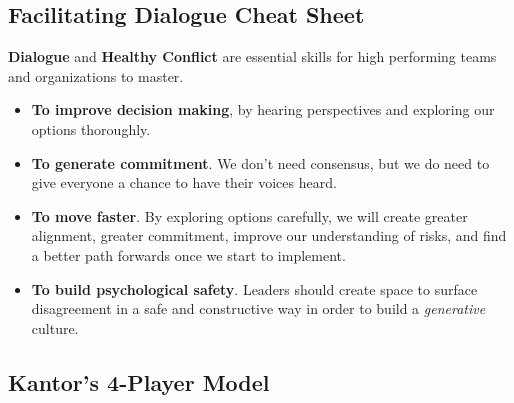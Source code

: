 \documentclass{article}
\newenvironment{nosepitemize}
{ \begin{itemize}
    \setlength{\itemsep}{0pt}
    \setlength{\parskip}{0pt}
    \setlength{\parsep}{0pt}     }
{ \end{itemize}                  }
\begin{document}
\begin{center}
     \section{Facilitating Dialogue Cheat Sheet}
\end{center}

\begin{multicols}{2}

\noindent
\textbf{Dialogue} and \textbf{Healthy Conflict} are essential skills for high performing teams and organizations to master.

\begin{nosepitemize}
    \item \textbf{To improve decision making}, by hearing perspectives and exploring our options thoroughly.
    \item \textbf{To generate commitment}. We don't need consensus, but we do need to give everyone a chance to have their voices heard.
    \item \textbf{To move faster}. By exploring options carefully, we will create greater alignment, greater commitment, improve our understanding of risks, and find a better path forwards once we start to implement.
    \item \textbf{To build psychological safety}. Leaders should create space to surface disagreement in a safe and constructive way in order to build a \textit{generative} culture.
\end{nosepitemize}

\end{multicols}

\begin{center}
\section{Kantor's 4-Player Model}
\end{center}
\end{document}
